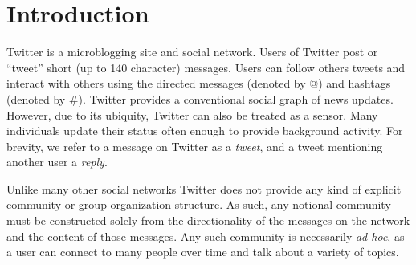 \section{Introduction}

Twitter is a microblogging site and social network.  Users of Twitter post or ``tweet'' short (up to 140 character) messages.  Users can follow others tweets and interact with others using the directed messages (denoted by @) and hashtags (denoted by \#). Twitter provides a conventional social graph of news updates.  However, due to its ubiquity, Twitter can also be treated as a sensor.  Many individuals update their status often enough to provide background activity.  For brevity, we refer to a message on Twitter as a \emph{tweet}, and a tweet mentioning another user a \emph{reply}.

Unlike many other social networks Twitter does not provide any kind of explicit community or group organization structure.  As such, any notional community must be constructed solely from the directionality of the messages on the network and the content of those messages.  Any such community is necessarily \emph{ad hoc}, as a user can connect to many people over time and talk about a variety of topics.
